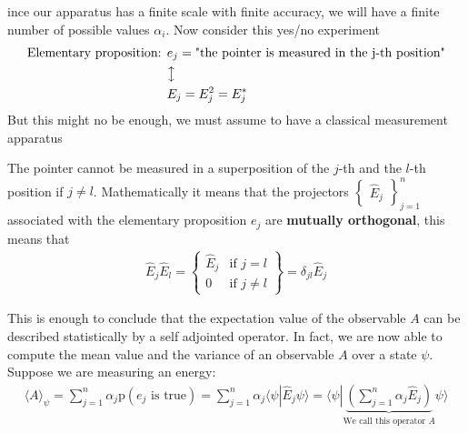 \documentclass[../main.tex]{subfiles}
\begin{document}
ince our apparatus has a finite scale with finite accuracy, we will have a finite number of possible values $\alpha_i$. 
Now consider this yes/no experiment
\[
\begin{split}
\textrm{Elementary proposition: } &e_j = \textrm{"the pointer is measured in the j-th position"}\\
&\big\updownarrow\\
& E_j = E_j^2=E_j^\ast
\end{split}
\]
But this might no be enough, we must assume to have a classical measurement apparatus
\begin{assumption} The pointer cannot be measured in a superposition of the $j$-th and the $l$-th position if $j\neq l$. Mathematically it means that the projectors $\begin{Bmatrix}
  \hat{E}_j
\end{Bmatrix}_{j=1}^n$ associated with the elementary proposition $e_j$ are \textbf{mutually orthogonal}, this means that
\begin{align*}
\hat{E}_j\hat{E}_l=
\begin{Bmatrix}
\hat{E}_j & \mbox{if } j=l\\
0 & \mbox{if } j\ne l
\end{Bmatrix}=\delta_{jl}\hat{E}_j
\end{align*}
\end{assumption}
This is enough to conclude that the expectation value of the observable $A$ can be described statistically by a self adjointed operator. In fact, we are now able to compute the mean value and the variance of an observable $A$ over a state $\psi$. Suppose we are measuring an energy:
\begin{align*}
\langle A \rangle _{\psi}=\sum_{j=1}^n \alpha_j \textrm{p}(e_j \mbox{ is true})=\sum_{j=1}^n \alpha_j \langle \psi | \hat{E}_j \psi \rangle=\langle \psi | \underbrace{\left(\sum_{j=1}^n \alpha_j \hat{E}_j\right)}_{\textrm{We call this operator } A}\psi \rangle 
\end{align*}
\end{document}
